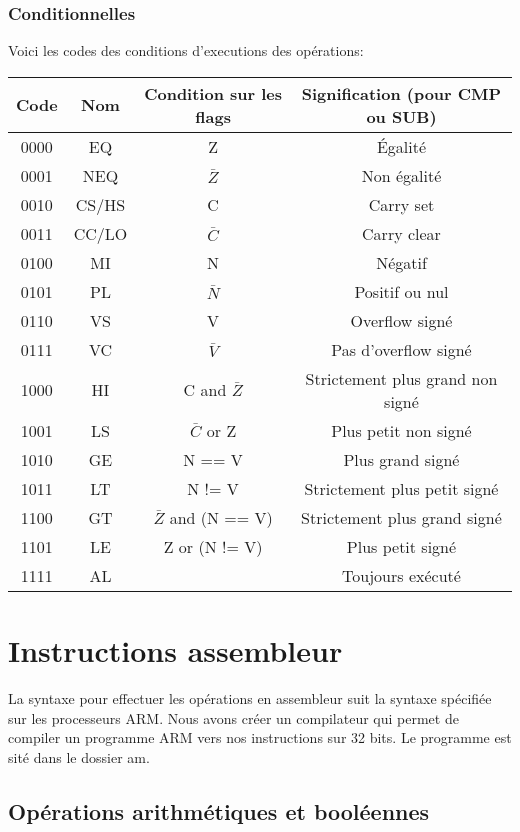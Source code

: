 \documentclass[a4paper]{article}
\begin{document}
  \subsubsection{Conditionnelles}

  Voici les codes des conditions d'executions des opérations:\\

\begin{tabular}{|c|c|c|c|}
  \hline
  Code & Nom & Condition sur les flags & Signification (pour CMP ou SUB)\\
  \hline
  0000 & EQ & Z & Égalité\\
  0001 & NEQ & $\bar{Z}$ & Non égalité\\
  0010 & CS/HS & C & Carry set\\
  0011 & CC/LO & $\bar{C}$ & Carry clear\\
  0100 & MI & N & Négatif \\
  0101 & PL & $\bar{N}$ & Positif ou nul \\
  0110 & VS & V & Overflow signé \\
  0111 & VC & $\bar{V}$ & Pas d'overflow signé \\
  1000 & HI & C and $\bar{Z}$ & Strictement plus grand non signé \\
  1001 & LS & $\bar{C}$ or Z & Plus petit non signé \\
  1010 & GE & N == V & Plus grand signé \\
  1011 & LT & N != V & Strictement plus petit signé\\
  1100 & GT & $\bar{Z}$ and (N == V) & Strictement plus grand signé \\
  1101 & LE & Z or (N != V) & Plus petit signé \\
  1111 & AL &  & Toujours exécuté \\
  \hline
\end{tabular}

\section{Instructions assembleur}

La syntaxe pour effectuer les opérations en assembleur suit la syntaxe spécifiée
sur les processeurs ARM. Nous avons créer un compilateur qui permet de compiler
un programme ARM vers nos instructions sur 32 bits. Le programme est sité dans
le dossier am.

\subsection{Opérations arithmétiques et booléennes}
\end{document}

